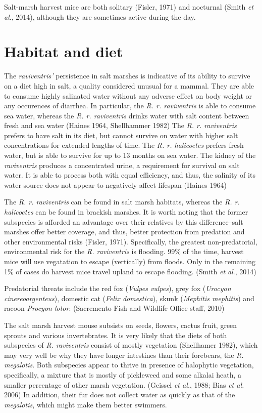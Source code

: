 \documentclass[a4paper]{article}
\begin{document}
Salt-marsh harvest mice are both solitary (Fisler, 1971) and nocturnal (Smith \textit{et al}., 2014), although they are sometimes active during the day.

\section{Habitat and diet}
The \textit{raviventris'} persistence in salt marshes is indicative of its ability to survive on a diet high in salt, a quality considered unusual for a mammal. They are able to consume highly salinated water without any adverse effect on body weight or any occurences of diarrhea. In particular, the \textit{R. r. raviventris} is able to consume sea water, whereas the \textit{R. r. raviventris} drinks water with salt content between fresh and sea water (Haines 1964, Shellhammer 1982) The \textit{R. r. raviventris} prefers to have salt in its diet, but cannot survive on water with higher salt concentrations for extended lengths of time. The \textit{R. r. halicoetes} prefers fresh water, but is able to survive for up to 13 months on sea water. 
The kidney of the \textit{raviventris} produces a concentrated urine, a requirement for survival on salt water. It is able to process both with equal efficiency, and thus, the salinity of its water source does not appear to negatively affect lifespan (Haines 1964)

The \textit{R. r. raviventris} can be found in salt marsh habitats, whereas the \textit{R. r. halicoetes} can be found in brackish marshes. It is worth noting that the former subspecies is afforded an advantage over their relatives by this difference--salt marshes offer better coverage, and thus, better protection from predation and other environmental risks (Fisler, 1971). Specifically, the greatest non-predatorial, environmental risk for the \textit{R. raviventris} is flooding. 99\% of the time, harvest mice will use vegatation to escape (vertically) from floods. Only in the remaining 1\% of cases do harvest mice travel upland to escape flooding. (Smith \textit{et al}., 2014)

Predatorial threats include the red fox (\textit{Vulpes vulpes}), grey fox (\textit{Urocyon cinereoargenteus}), domestic cat (\textit{Felix domestica}), skunk (\textit{Mephitis mephitis}) and racoon \textit{Procyon lotor}. (Sacremento Fish and Wildlife Office staff, 2010)

The salt marsh harvest mouse subsists on seeds, flowers, cactus fruit, green sprouts and various invertebrates. It is very likely that the diets of both subspecies of \textit{R. raviventris} consist of mostly vegetation (Shellhamer 1982), which may very well be why they have longer intestines than their forebears, the \textit{R. megalotis}. Both subspecies appear to thrive in presence of halophytic vegetation, specifically, a mixture that is mostly of pickleweed and some alkalai heath, a smaller percentage of other marsh vegetation. (Geissel \textit{et al.}, 1988; Bias \textit{et al.} 2006) In addition, their fur does not collect water as quickly as that of the \textit{megalotis}, which might make them better swimmers. 
\end{document}
